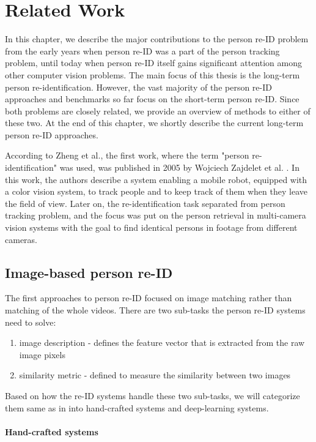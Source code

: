 \chapter{Related Work}

In this chapter, we describe the major contributions to the person re-ID problem from the early years when person re-ID was a part of the person tracking problem, until today when person re-ID itself gains significant attention among other computer vision problems. The main focus of this thesis is the long-term person re-identification. However, the vast majority of the person re-ID approaches and benchmarks so far focus on the short-term person re-ID. Since both problems are closely related, we provide an overview of methods to either of these two. At the end of this chapter, we shortly describe the current long-term person re-ID approaches.

According to Zheng et al.\cite{Zheng_past_pres_future}, the first work, where the term "person re-identification" was used, was published in 2005 by Wojciech Zajdelet et al. \cite{first_publications}. In this work, the authors describe a system enabling a mobile robot, equipped with a color vision system, to track people and to keep track of them when they leave the field of view. Later on, the re-identification task separated from person tracking problem, and the focus was put on the person retrieval in multi-camera vision systems with the goal to find identical persons in footage from different cameras.


\section{Image-based person re-ID}
The first approaches to person re-ID focused on image matching rather than matching of the whole videos.
There are two sub-tasks the person re-ID systems need to solve: 
 
\begin{enumerate}[label=(\alph*)]
\item image description  - defines the feature vector that is extracted from the raw image pixels
\item similarity metric - defined to measure the similarity between two images
\end{enumerate}

Based on how the re-ID systems handle these two sub-tasks, we will categorize them same as in \cite{Zheng_past_pres_future} into hand-crafted systems and deep-learning systems.
\subsubsection{Hand-crafted systems}

